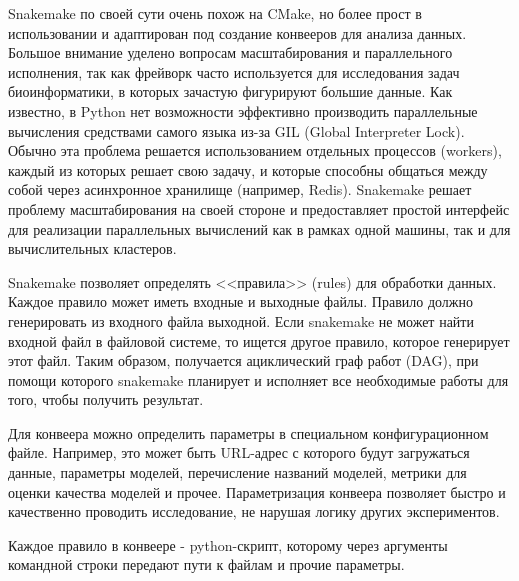 \documentclass[a4paper,article,14pt]{extarticle}
\begin{document}
Snakemake по своей сути очень похож на CMake, но более прост в использовании и адаптирован под создание конвееров для анализа данных.
Большое внимание уделено вопросам масштабирования и параллельного исполнения, так как фрейворк часто используется для исследования задач биоинформатики, в которых зачастую фигурируют большие данные.
Как известно, в Python нет возможности эффективно производить параллельные вычисления средствами самого языка из-за GIL (Global Interpreter Lock).
Обычно эта проблема решается использованием отдельных процессов (workers), каждый из которых решает свою задачу, и которые способны общаться между собой через асинхронное хранилище (например, Redis).
Snakemake решает проблему масштабирования на своей стороне и предоставляет простой интерфейс для реализации параллельных вычислений как в рамках одной машины, так и для вычислительных кластеров.
\par

Snakemake позволяет определять <<правила>> (rules) для обработки данных.
Каждое правило может иметь входные и выходные файлы.
Правило должно генерировать из входного файла выходной.
Если snakemake не может найти входной файл в файловой системе, то ищется другое правило, которое генерирует этот файл.
Таким образом, получается ациклический граф работ (DAG), при помощи которого snakemake планирует и исполняет все необходимые работы для того, чтобы получить результат.
\par

Для конвеера можно определить параметры в специальном конфигурационном файле.
Например, это может быть URL-адрес с которого будут загружаться данные, параметры моделей, перечисление названий моделей, метрики для оценки качества моделей и прочее.
Параметризация конвеера позволяет быстро и качественно проводить исследование, не нарушая логику других экспериментов.
\par

Каждое правило в конвеере - python-скрипт, которому через аргументы командной строки передают пути к файлам и прочие параметры.
\par
\end{document}
